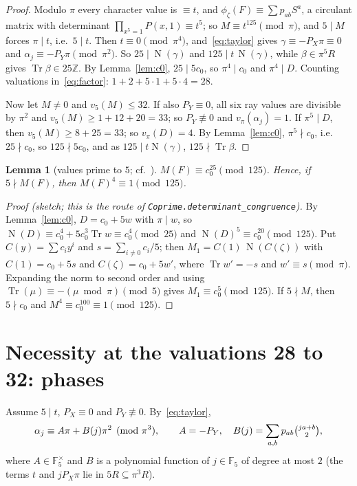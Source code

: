 \documentclass[11pt]{article}
\newtheorem{lemma}{Lemma}
\theoremstyle{definition}
\theoremstyle{remark}
\newcommand{\F}{\mathbb F_5}
\newcommand{\Z}{\mathbb Z}
\newcommand{\Tr}{\operatorname{Tr}}
\newcommand{\N}{\operatorname{N}}
\newcommand{\vp}{v_\pi}
\begin{document}
\begin{proof}
Modulo $\pi$ every character value is $\equiv t$, and $\phi_\zeta(F)\equiv
\sum p_{ab}S^a$, a circulant matrix with determinant
$\prod_{x^5=1}P(x,1)\equiv t^5$; so $M\equiv t^{125}\pmod\pi$,
and $5\mid M$ forces $\pi\mid t$, i.e.\ $5\mid t$. Then $t\equiv0\pmod{\pi^4}$,
and~\eqref{eq:taylor} gives $\gamma\equiv-P_X\pi\equiv0$ and
$\alpha_j\equiv-P_Y\pi\pmod{\pi^2}$. So $25\mid\N(\gamma)$ and
$125\mid t\,\N(\gamma)$, while $\beta\in\pi^5R$ gives $\Tr\beta\in25\Z$. By
Lemma~\ref{lem:c0}, $25\mid5c_0$, so $\pi^4\mid c_0$ and $\pi^4\mid D$.
Counting valuations in~\eqref{eq:factor}: $1+2+5\cdot1+5\cdot4=28$.

Now let $M\ne0$ and $v_5(M)\le32$. If also $P_Y\equiv0$, all six ray values
are divisible by $\pi^2$ and $v_5(M)\ge1+12+20=33$; so $P_Y\not\equiv0$ and
$\vp(\alpha_j)=1$. If $\pi^5\mid D$, then $v_5(M)\ge8+25=33$; so $\vp(D)=4$.
By Lemma~\ref{lem:c0}, $\pi^5\nmid c_0$, i.e.\ $25\nmid c_0$, so
$125\nmid5c_0$, and as $125\mid t\N(\gamma)$, $125\nmid\Tr\beta$.
\end{proof}

\begin{lemma}[{values prime to $5$; cf.~\cite[Theorem~3.1]{mp}}]\label{lem:coprime}
$M(F)\equiv c_0^{25}\pmod{125}$. Hence, if $5\nmid M(F)$, then
$M(F)^4\equiv1\pmod{125}$.
\end{lemma}

\begin{proof}[Proof (sketch; this is the route of \texttt{Coprime.determinant\_congruence})]
By Lemma~\ref{lem:c0}, $D=c_0+5w$ with $\pi\mid w$, so
$\N(D)\equiv c_0^4+5c_0^3\Tr w\equiv c_0^4\pmod{25}$ and
$\N(D)^5\equiv c_0^{20}\pmod{125}$. Put $C(y)=\sum c_iy^i$ and
$s=\sum_{i\ne0}c_i/5$; then $M_1=C(1)\,\N(C(\zeta))$ with $C(1)=c_0+5s$ and
$C(\zeta)=c_0+5w'$, where $\Tr w'=-s$ and $w'\equiv s\pmod\pi$. Expanding the
norm to second order and using $\Tr(\mu)\equiv-(\mu\bmod\pi)\pmod5$ gives
$M_1\equiv c_0^5\pmod{125}$. If $5\nmid M$, then $5\nmid c_0$ and
$M^4\equiv c_0^{100}\equiv1\pmod{125}$.
\end{proof}

\section{Necessity at the valuations 28 to 32: phases}\label{sec:necessity}

Assume $5\mid t$, $P_X\equiv0$ and $P_Y\not\equiv0$. By~\eqref{eq:taylor},
\begin{equation}\label{eq:AB}
\alpha_j\equiv A\pi+B(j)\pi^2\pmod{\pi^3},\qquad
A=-P_Y,\quad B(j)=\sum_{a,b}p_{ab}\tbinom{ja+b}{2},
\end{equation}
where $A\in\F^\times$ and $B$ is a polynomial function of $j\in\F$ of degree at
most $2$ (the terms $t$ and $jP_X\pi$ lie in $5R\subseteq\pi^3R$).
\end{document}
